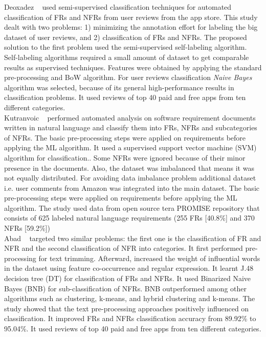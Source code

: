 Deoxadez \etal~\cite{Deocadez:2017} used semi-supervised classification
techniques for automated classification of FRs and NFRs from user reviews from
the app store. This study dealt with two problems: 1) minimizing the annotation
effort for labeling the big dataset of user reviews, and 2) classification of
FRs and NFRs. The proposed solution to the first problem used
the semi-supervised self-labeling algorithm. Self-labeling algorithms required a
small amount of dataset to get comparable results as supervised techniques. Features were obtained
by applying the standard pre-processing and BoW algorithm. For user reviews classification \emph{Naive Bayes}
algorithm was selected, because of its general high-performance results in classification
problems. It used reviews of top 40 paid and free apps from ten
different categories.\\

Kutranvoic \etal ~ \cite {Kurtanovic:2017} performed automated analysis on
software requirement documents written in natural language  and classify them into FRs,
NFRs and subcategories of NFRs. The basic pre-processing steps were applied on requirements before applying the ML algorithm. It used a supervised support vector machine (SVM) algorithm for classification.. Some NFRs were ignored because of their minor presence in the documents. Also, the dataset was imbalanced that means it was not equally distributed. For avoiding data imbalance problem additional dataset i.e. user comments
from Amazon was integrated into the main dataset. The basic pre-processing steps were applied on requirements before applying the ML algorithm. The study used data from open source tera PROMISE repository that consists of 625 labeled natural language requirements (255 FRs
[40.8\%] and 370 NFRs [59.2\%])\\

 Abad \etal ~ \cite{Abad:2017} targeted two similar problems: the first one is the classification of FR and NFR and the second classification of NFR into categories.
 It first performed pre-processing for text trimming. Afterward, increased the weight of influential words in the
dataset using feature co-occurrence and regular
expression. It learnt J.48 decision tree (DT) for classification of FRs and NFRs. It used Binarized Naive Bayes (BNB) for sub-classification of NFRs. BNB outperformed among other algorithms such as clustering, k-means, and hybrid clustering and k-means. 
The study showed that the text pre-processing approaches positively influenced on classification. It improved FRs and NFRs
 classification accuracy from 89.92\% to 95.04\%. It used reviews of top 40 paid and free apps from ten
different categories.\\

